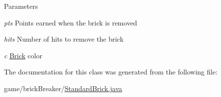 \begin{DoxyParams}{Parameters}
\item[{\em pts}]Points earned when the brick is removed \item[{\em hits}]Number of hits to remove the brick \item[{\em c}]\hyperlink{classbrick_breaker_1_1_brick}{Brick} color \end{DoxyParams}


The documentation for this class was generated from the following file:\begin{DoxyCompactItemize}
\item 
game/brickBreaker/\hyperlink{_standard_brick_8java}{StandardBrick.java}\end{DoxyCompactItemize}
